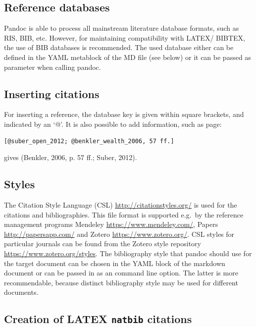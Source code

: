 \documentclass[10pt,fleqn]{wlpeerj}
\begin{document}
\subsection{Reference databases}\label{reference-databases}

Pandoc is able to process all mainstream literature database formats,
such as RIS, BIB, etc. However, for maintaining compatibility with
LATEX/ BIBTEX, the use of BIB databases is recommended. The used
database either can be defined in the YAML metablock of the MD file (see
below) or it can be passed as parameter when calling pandoc.

\subsection{Inserting citations}\label{inserting-citations}

For inserting a reference, the database key is given within square
brackets, and indicated by an `@'. It is also possible to add
information, such as page:

\begin{verbatim}
[@suber_open_2012; @benkler_wealth_2006, 57 ff.]
\end{verbatim}

gives (Benkler, 2006, p. 57 ff.; Suber, 2012).

\subsection{Styles}\label{styles}

The Citation Style Language (CSL) \url{http://citationstyles.org/} is
used for the citations and bibliographies. This file format is supported
e.g.~by the reference management programs Mendeley
\url{https://www.mendeley.com/}, Papers \url{http://papersapp.com/} and
Zotero \url{https://www.zotero.org/}. CSL styles for particular journals
can be found from the Zotero style repository
\url{https://www.zotero.org/styles}. The bibliography style that pandoc
should use for the target document can be chosen in the YAML block of
the markdown document or can be passed in as an command line option. The
latter is more recommendable, because distinct bibliography style may be
used for different documents.

\subsection{\texorpdfstring{Creation of LATEX \texttt{natbib}
citations}{Creation of LATEX natbib citations}}\label{creation-of-latex-natbib-citations}
\end{document}
